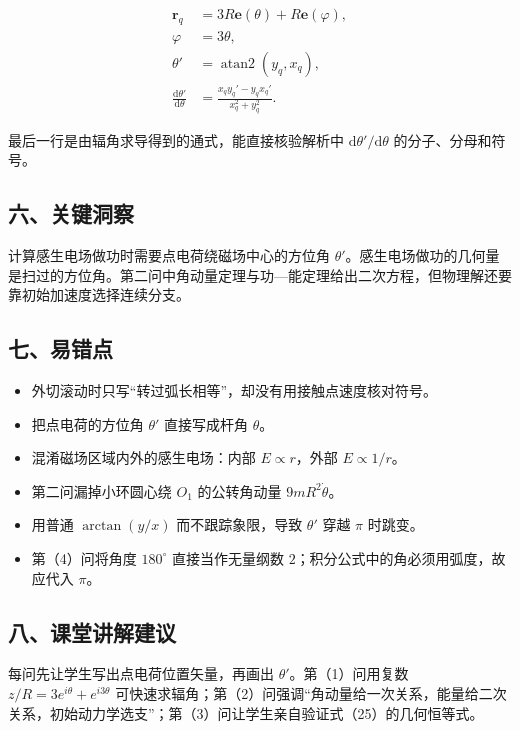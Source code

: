 \documentclass[12pt,a4paper,UTF8]{ctexart}
\newcommand{\tightlist}{\setlength{\itemsep}{0pt}\setlength{\parskip}{0pt}}
\begin{document}
\[\begin{aligned}
\boldsymbol r_q
&=3R\boldsymbol e(\theta)+R\boldsymbol e(\varphi),\\
\varphi&=3\theta,\\
\theta'&=\operatorname{atan2}(y_q,x_q),\\
\frac{\mathrm d\theta'}{\mathrm d\theta}
&=\frac{x_qy_q'-y_qx_q'}{x_q^2+y_q^2}.
\end{aligned}\]

最后一行是由辐角求导得到的通式，能直接核验解析中
\(\mathrm d\theta'/\mathrm d\theta\) 的分子、分母和符号。

\subsection{六、关键洞察}\label{ux516dux5173ux952eux6d1eux5bdf-4}

计算感生电场做功时需要点电荷绕磁场中心的方位角
\(\theta'\)。感生电场做功的几何量是扫过的方位角。第二问中角动量定理与功---能定理给出二次方程，但物理解还要靠初始加速度选择连续分支。

\subsection{七、易错点}\label{ux4e03ux6613ux9519ux70b9-4}

\begin{itemize}
\tightlist
\item
  外切滚动时只写``转过弧长相等''，却没有用接触点速度核对符号。
\item
  把点电荷的方位角 \(\theta'\) 直接写成杆角 \(\theta\)。
\item
  混淆磁场区域内外的感生电场：内部 \(E\propto r\)，外部
  \(E\propto1/r\)。
\item
  第二问漏掉小环圆心绕 \(O_1\) 的公转角动量 \(9mR^2\dot\theta\)。
\item
  用普通 \(\arctan(y/x)\) 而不跟踪象限，导致 \(\theta'\) 穿越 \(\pi\)
  时跳变。
\item
  第（4）问将角度 \(180^\circ\) 直接当作无量纲数
  \(2\)；积分公式中的角必须用弧度，故应代入 \(\pi\)。
\end{itemize}

\subsection{八、课堂讲解建议}\label{ux516bux8bfeux5802ux8bb2ux89e3ux5efaux8bae-4}

每问先让学生写出点电荷位置矢量，再画出 \(\theta'\)。第（1）问用复数
\(z/R=3e^{i\theta}+e^{i3\theta}\)
可快速求辐角；第（2）问强调``角动量给一次关系，能量给二次关系，初始动力学选支''；第（3）问让学生亲自验证式（25）的几何恒等式。
\end{document}
